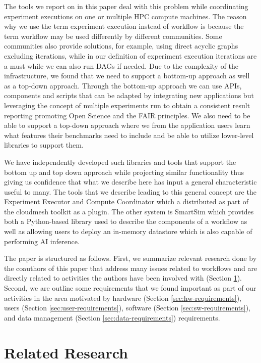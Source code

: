 \documentclass[utf8]{FrontiersinVancouver} %
\newcommand{\TODO}[1]{\todo[inline]{#1}}
\begin{document}
The tools we report on in this paper deal with this problem while coordinating experiment executions on one or multiple HPC compute machines. The reason why we use the term experiment execution instead of workflow is because the term workflow may be used differently by different communities. Some communities also provide solutions, for example, using direct acyclic graphs excluding iterations, while in our definition of experiment execution iterations are a must while we can also run DAGs if needed. Due to the complexity of the infrastructure, we found that we need to support a bottom-up approach as well as a top-down approach. Through the bottom-up approach we can use APIs, components and scripts that can be adapted by integrating new applications but leveraging the concept of multiple experiments run to obtain a consistent result reporting promoting Open Science and the FAIR principles. We also need to be able to support a top-down approach where we from the application users learn what features their benchmarks need to include and be able to utilize lower-level libraries to support them.

We have independently developed such libraries and tools that support the bottom up and top down approach while projecting similar functionality thus giving us confidence that what we describe here has input a general characteristic useful to many. The tools that we describe leading to this general concept are the Experiment Executor and Compute Coordinator which a distributed as part of the cloudmesh toolkit as a plugin. The other system is SmartSim which provides both a Python-based library used to describe the components of a workflow as well as allowing users to deploy an in-memory datastore which is also capable of performing AI inference. 

The paper is structured as follows. First, we summarize relevant research done by the coauthors of this paper that address many issues related to workflows and are directly related to activities the authors have been involved with (Section \ref{sec:related}).
Second, we are outline some requirements that we found important as part of our activities in the area motivated by hardware (Section \ref{sec:hw-requirements}), users (Section \ref{sec:user-requirements}), software (Section \ref{sec:sw-requirements}), and data management (Section \ref{sec:data-requirements}) requirements.

\TODO{complete structure of paper}



\section{Related Research}
\label{sec:related}
\end{document}
